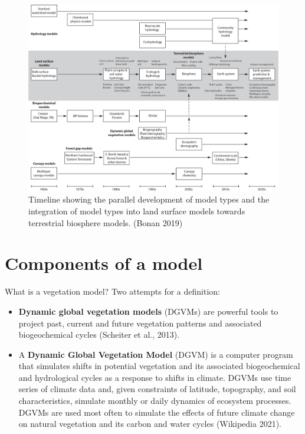 \documentclass[12pt,oneside]{book}
\providecommand{\tightlist}{%
  \setlength{\itemsep}{0pt}\setlength{\parskip}{0pt}}
\begin{document}
\begin{figure}

{\centering \includegraphics[width=0.8\linewidth]{figures/chap1/timeline} 

}

\caption{Timeline showing the parallel development of model types and the integration of model types into land surface models towards terrestrial biosphere models. (Bonan 2019)}\label{fig:f7}
\end{figure}

\section{Components of a model}\label{components-of-a-model}

What is a vegetation model? Two attempts for a definition:

\begin{itemize}
\tightlist
\item
  \textbf{Dynamic global vegetation models} (DGVMs) are powerful tools
  to project past, current and future vegetation patterns and associated
  biogeochemical cycles (Scheiter et al., 2013).
\item
  A \textbf{Dynamic Global Vegetation Model} (DGVM) is a computer
  program that simulates shifts in potential vegetation and its
  associated biogeochemical and hydrological cycles as a response to
  shifts in climate. DGVMs use time series of climate data and, given
  constraints of latitude, topography, and soil characteristics,
  simulate monthly or daily dynamics of ecosystem processes. DGVMs are
  used most often to simulate the effects of future climate change on
  natural vegetation and its carbon and water cycles (Wikipedia 2021).
\end{itemize}
\end{document}

